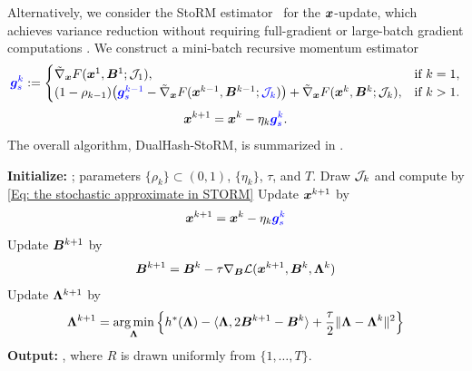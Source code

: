 Alternatively, we consider the StoRM estimator~\cite{cutkoskyMomentumBasedVarianceReduction2019} for the $\bm{x}$-update, which achieves variance reduction without requiring full-gradient or large-batch gradient computations . We construct a mini-batch recursive momentum estimator 
\begin{equation}
\label{Eq: the stochastic approximate in STORM}
\blue{\bg_s^k} :=
\begin{cases}
\tilde{\nabla}_{\bx} F(\bx^1, \bB^1; \calJ_1), &\text{if }  k = 1, \\
(1 - \rho_{k-1}) \big( \blue{\bg_s^{k-1}} - \tilde{\nabla}_{\bx} F(\bx^{k-1}, \bB^{k-1};\blue{\calJ_k})\big)+\tilde{\nabla}_{\bx} F(\bx^k, \bB^k; \calJ_k), & \text{if } k > 1.
\end{cases}
\end{equation}
\begin{equation}
\label{Eq: the update of x in STORM}
    \bx^{k+1} = \bx^k - \eta_k \blue{\bg_s^k}.
\end{equation}
The overall algorithm, DualHash-StoRM, is summarized in .

\begin{algorithm}[t]
\color{black}
\caption{DualHash-StoRM}
\label{alg:our_algorithm_storm}
\begin{algorithmic}[1]
\STATE \textbf{Initialize:} ; parameters $\{\rho_k\}\subset(0,1)$, $\{\eta_k\}$, $\tau$, and $T$.
  \STATE Draw $\mathcal{J}_k$ and compute  by \eqref{Eq: the stochastic approximate in STORM}
  \STATE Update $\bm{x}^{k+1}$ by
  \[
  \bm{x}^{k+1} = \bm{x}^k - \eta_k {\color{blue}\bm{g}_s^k}
  \]
  \STATE Update $\bm{B}^{k+1}$ by
  \[
  \bm{B}^{k+1} = \bm{B}^k - \tau \nabla_{\bm{B}}\mathcal{L}(\bm{x}^{k+1}, \bm{B}^k, \bm{\Lambda}^k)
  \]
  \STATE Update $\bm{\Lambda}^{k+1}$ by
  \[
  \bm{\Lambda}^{k+1} = \operatorname*{arg\,min}_{\bm{\Lambda}} \Big\{ h^*(\bm{\Lambda}) - \langle \bm{\Lambda}, 2\bm{B}^{k+1} - \bm{B}^k \rangle + \frac{\tau}{2} \| \bm{\Lambda} - \bm{\Lambda}^k\|^2 \Big\}
  \]
\ENDFOR
\STATE \textbf{Output:} , where $R$ is drawn uniformly from $\{1,\ldots,T\}$.
\end{algorithmic}
\end{algorithm}

